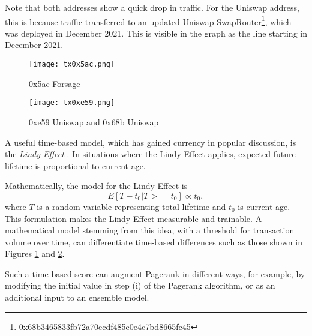 \documentclass[a4paper]{article}
\begin{document}
Note that both addresses show a quick drop in traffic.  For the Uniswap address, this is because traffic transferred to an updated Uniswap SwapRouter\footnote{0x68b3465833fb72a70ecdf485e0e4c7bd8665fc45}, which was deployed in December 2021.  This is visible in the graph as the line starting in December 2021.

\begin{figure}[h]
\begin{center}
\texttt{[image: tx0x5ac.png]}
\caption{0x5ac Forsage}
\label{0x5ac}
\end{center}
\end{figure}



\begin{figure}[h]
\begin{center}
\texttt{[image: tx0xe59.png]}
\caption{ 0xe59 Uniswap and 0x68b Uniswap}
\label{0xe59}
\end{center}
\end{figure}



A useful time-based model, which has gained currency in popular discussion, is the {\it Lindy Effect} \cite{Lindy}.  In situations where the Lindy Effect applies, expected future lifetime is proportional to current age. 

Mathematically, the model for the Lindy Effect is
$$E[T-t_0 | T >= t_0] \propto t_0,$$ 
where $T$ is a random variable representing total lifetime and $t_0$ is current age.  This formulation makes the Lindy Effect measurable and trainable.  A mathematical model stemming from this idea, with a threshold for transaction volume over time, can differentiate time-based differences such as those shown in Figures \ref{0x5ac} and \ref{0xe59}.  

Such a time-based score can augment Pagerank in different ways, for example, by modifying the initial value in step (i) of the Pagerank algorithm, or as an additional input to an ensemble model.
\end{document}
